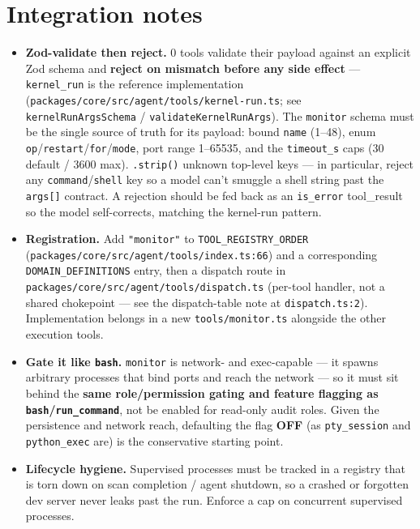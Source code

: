 \documentclass[11pt]{article}
\begin{document}
\section{Integration notes}

\begin{itemize}[leftmargin=*]
  \item \textbf{Zod-validate then reject.} 0 tools validate their payload
  against an explicit Zod schema and \textbf{reject on mismatch before any side
  effect} --- \texttt{kernel\_run} is the reference implementation
  (\texttt{packages/core/src/agent/tools/kernel-run.ts}; see
  \texttt{kernelRunArgsSchema} / \texttt{validateKernelRunArgs}). The
  \texttt{monitor} schema must be the single source of truth for its payload:
  bound \texttt{name} (1--48), enum \texttt{op}/\texttt{restart}/\texttt{for}/\texttt{mode},
  port range 1--65535, and the \texttt{timeout\_s} caps (30 default / 3600 max).
  \texttt{.strip()} unknown top-level keys --- in particular, reject any
  \texttt{command}/\texttt{shell} key so a model can't smuggle a shell string past
  the \texttt{args[]} contract. A rejection should be fed back as an
  \texttt{is\_error} tool\_result so the model self-corrects, matching the
  kernel-run pattern.
  \item \textbf{Registration.} Add \texttt{"monitor"} to
  \texttt{TOOL\_REGISTRY\_ORDER} (\texttt{packages/core/src/agent/tools/index.ts:66})
  and a corresponding \texttt{DOMAIN\_DEFINITIONS} entry, then a dispatch route in
  \texttt{packages/core/src/agent/tools/dispatch.ts} (per-tool handler, not a
  shared chokepoint --- see the dispatch-table note at \texttt{dispatch.ts:2}).
  Implementation belongs in a new \texttt{tools/monitor.ts} alongside the other
  execution tools.
  \item \textbf{Gate it like \texttt{bash}.} \texttt{monitor} is network- and
  exec-capable --- it spawns arbitrary processes that bind ports and reach the
  network --- so it must sit behind the \textbf{same role/permission gating and
  feature flagging as \texttt{bash}/\texttt{run\_command}}, not be enabled for
  read-only audit roles. Given the persistence and network reach, defaulting the
  flag \textbf{OFF} (as \texttt{pty\_session} and \texttt{python\_exec} are) is the
  conservative starting point.
  \item \textbf{Lifecycle hygiene.} Supervised processes must be tracked in a
  registry that is torn down on scan completion / agent shutdown, so a crashed or
  forgotten dev server never leaks past the run. Enforce a cap on concurrent
  supervised processes.
\end{itemize}
\end{document}
